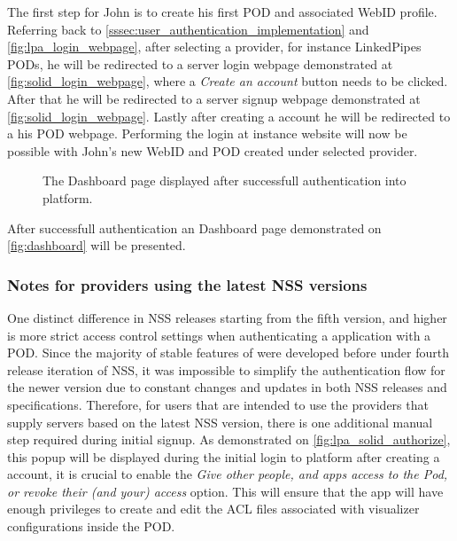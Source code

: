 The first step for John is to create his first \solid{} POD and associated WebID profile. Referring back to \autoref{sssec:user_authentication_implementation} and \autoref{fig:lpa_login_webpage}, after selecting a provider, for instance LinkedPipes PODs, he will be redirected to a \solid{} server login webpage demonstrated at \autoref{fig:solid_login_webpage}, where a \textit{Create an account} button needs to be clicked. After that he will be redirected to a \solid{} server signup webpage demonstrated at \autoref{fig:solid_login_webpage}. Lastly after creating a \solid{} account he will be redirected to a his POD webpage. Performing the login at \lpa{} instance website will now be possible with John's new WebID and \solid{} POD created under selected provider.

\begin{figure}[h]
\centering
{}
\caption{The Dashboard page displayed after successfull authentication into \lpa{} platform.}
\label{fig:dashboard}
\end{figure}

After successfull authentication an \lpa{} Dashboard page demonstrated on \autoref{fig:dashboard} will be presented. 

\subsubsection{Notes for providers using the latest NSS versions}

One distinct difference in NSS releases starting from the fifth version, and higher is more strict access control settings when authenticating a \solid{} application with a \solid{} POD. Since the majority of stable features of \lpas{} were developed before under fourth release iteration of NSS, it was impossible to simplify the authentication flow for the newer version due to constant changes and updates in both NSS releases and \solid{} specifications. Therefore, for \lpa{} users that are intended to use the providers that supply \solid{} servers based on the latest NSS version, there is one additional manual step required during initial signup. As demonstrated on \autoref{fig:lpa_solid_authorize}, this popup will be displayed during the initial login to \lpa{} platform after creating a \solid{} account, it is crucial to enable the \textit{Give other people, and apps access to the Pod, or revoke their (and your) access} option. This will ensure that the \solid{} app will have enough privileges to create and edit the ACL files associated with visualizer configurations inside the POD. 

